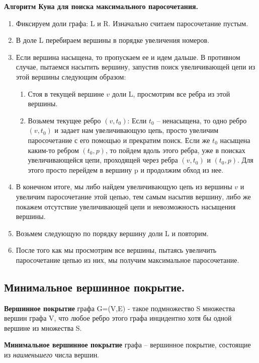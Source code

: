 \textbf{Алгоритм Куна для поиска максимального паросочетания.}
\begin{enumerate}
	\item Фиксируем доли графа: L и R. Изначально считаем паросочетание пустым. 
	\item В доле L перебираем вершины в порядке увеличения номеров.
	\item Если вершина насыщена, то пропускаем ее и идем дальше.
В противном случае, пытаемся насытить вершину, запустив поиск увеличивающей цепи из этой вершины следующим образом: 
	\begin{enumerate}
		\item Стоя в текущей вершине $v$ доли L, просмотрим все ребра из этой вершины.
		\item Возьмем текущее ребро $(v, t_0)$: 
Если $t_0$ -- ненасыщена, то одно ребро $(v, t_0)$ и задает нам увеличивающую цепь, просто увеличим паросочетание с его помощью и прекратим поиск.
Если же $t_0$ насыщена каким-то ребром  $(t_0, p)$, то пойдем вдоль этого ребра, уже в поисках увеличивающейся цепи, проходящей через ребра $(v, t_0)$ и  $(t_0, p)$. Для этого просто перейдем в вершину p и продолжим обход из нее.
	\end{enumerate}
\item В конечном итоге, мы либо найдем увеличивающую цепь из вершины $v$ и увеличим паросочетание этой цепью, тем самым насытив вершину, либо же покажем отсутствие увеличивающей цепи и невозможность насыщения вершины.
\item Возьмем следующую по порядку вершину доли L и повторим.
\item После того как мы просмотрим все вершины, пытаясь увеличить паросочетание цепью из них, мы получим максимальное паросочетание.
\end{enumerate}

\subsection*{Минимальное вершинное покрытие.}%
\label{sub:Минимальное вершинное покрытие.}

\begin{Def}
	\textbf{Вершинное покрытие} графа G=(V,E)  - такое подмножество S множества вершин графа V, что любое ребро этого графа инцидентно хотя бы одной вершине из множества S.
\end{Def}

\begin{Def}
	\textbf{Минимальное вершинное покрытие} графа -- вершинное покрытие, состоящие из \textit{наименьшего} числа вершин.
\end{Def}

